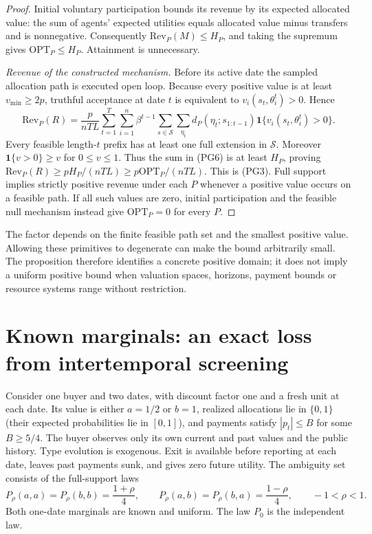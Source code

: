\documentclass[11pt,a4paper]{article}
\begin{document}
\begin{proof}
Initial voluntary participation bounds its revenue by its expected
allocated value: the sum of agents' expected utilities equals allocated
value minus transfers and is nonnegative. Consequently
$\mathrm{Rev}_P(M)\leq H_P$, and taking the supremum gives
$\mathrm{OPT}_P\leq H_P$. Attainment is unnecessary.

\emph{Revenue of the constructed mechanism.}
Before its active date the sampled allocation path is executed open loop.
Because every positive value is at least $v_{\min}\geq2p$, truthful
acceptance at date $t$ is equivalent to
$v_i(s_t,\theta_i^t)>0$. Hence
\[
 \mathrm{Rev}_P(R)
 =\frac{p}{nTL}
 \sum_{t=1}^T\sum_{i=1}^n\beta^{t-1}
 \sum_{s\in\mathcal S}\sum_{\eta_t}
 d_P(\eta_t;s_{1:t-1})
 \mathbf1\{v_i(s_t,\theta_i^t)>0\}.
 \tag{PG6}
\]
Every feasible length-$t$ prefix has at least one full extension in
$\mathcal S$. Moreover $\mathbf1\{v>0\}\geq v$ for $0\leq v\leq1$.
Thus the sum in \textup{(PG6)} is at least $H_P$, proving
$\mathrm{Rev}_P(R)\geq pH_P/(nTL)\geq p\mathrm{OPT}_P/(nTL)$.
This is \textup{(PG3)}. Full support implies strictly positive revenue
under each $P$ whenever a positive value occurs on a feasible path.
If all such values are zero, initial participation and the feasible null
mechanism instead give $\mathrm{OPT}_P=0$ for every $P$.
\end{proof}

The factor depends on the finite feasible path set and the smallest
positive value. Allowing these primitives to degenerate can make the bound
arbitrarily small. The proposition therefore identifies a concrete positive
domain; it does not imply a uniform positive bound when valuation spaces,
horizons, payment bounds or resource systems range without restriction.


\section{Known marginals: an exact loss from intertemporal screening}
\label{sec:intertemporal-example}

Consider one buyer and two dates, with discount factor one and a fresh
unit at each date. Its value is either $a=1/2$ or $b=1$, realized allocations lie in
$\{0,1\}$ (their expected probabilities lie in $[0,1]$), and payments satisfy $|p_t|\leq B$ for some $B\geq5/4$. The
buyer observes only its own current and past values and the public history.
Type evolution is exogenous. Exit is available before reporting at each
date, leaves past payments sunk, and gives zero future utility. The
ambiguity set consists of the full-support laws
\[
 P_\rho(a,a)=P_\rho(b,b)=\frac{1+\rho}{4},\qquad
 P_\rho(a,b)=P_\rho(b,a)=\frac{1-\rho}{4},\qquad -1<\rho<1.
 \tag{IT1}
\]
Both one-date marginals are known and uniform. The law $P_0$ is the
independent law.
\end{document}
